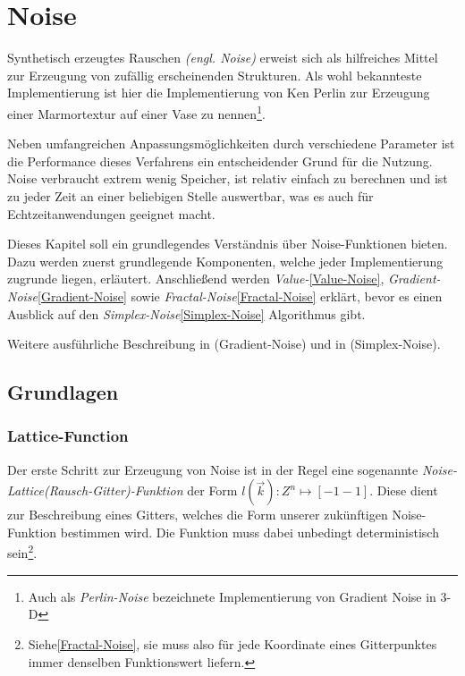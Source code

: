 \chapter{Noise}
Synthetisch erzeugtes Rauschen \emph{(engl. Noise)} erweist sich als hilfreiches Mittel zur Erzeugung von zufällig erscheinenden Strukturen.
Als wohl bekannteste Implementierung ist hier die Implementierung von Ken Perlin\cite{PERLIN1985} zur Erzeugung einer Marmortextur auf einer Vase zu nennen\footnote{Auch als \emph{Perlin-Noise} bezeichnete Implementierung von Gradient Noise in 3-D}.

Neben umfangreichen Anpassungsmöglichkeiten durch verschiedene Parameter ist die Performance dieses Verfahrens ein entscheidender Grund für die Nutzung. Noise verbraucht extrem wenig Speicher, ist relativ einfach zu berechnen und ist zu jeder Zeit an einer beliebigen Stelle auswertbar, was es auch für Echtzeitanwendungen geeignet macht.\cite{H.Hauser2010}

Dieses Kapitel soll ein grundlegendes Verständnis über Noise-Funktionen bieten. Dazu werden zuerst grundlegende Komponenten, welche jeder Implementierung zugrunde liegen, erläutert. Anschließend werden \emph{Value-}\ref{Value-Noise}, \emph{Gradient-Noise}\ref{Gradient-Noise} sowie \emph{Fractal-Noise}\ref{Fractal-Noise} erklärt, bevor es einen Ausblick auf den \emph{Simplex-Noise}\ref{Simplex-Noise} Algorithmus gibt.

Weitere ausführliche Beschreibung in \cite{BurgerGradientNoise2008} (Gradient-Noise) und in \cite{simplexNoise} (Simplex-Noise).

\section{Grundlagen}
\subsection{Lattice-Function}\label{latticeFunc}
Der erste Schritt zur Erzeugung von Noise ist in der Regel eine sogenannte \emph{Noise-Lattice(Rausch-Gitter)-Funktion}\cite{fractalsAndChaos} der Form \begin{math}l(\vec{k}): {Z}^n \mapsto [-1 - 1]\end{math}\label{latticeFunc}.
Diese dient zur Beschreibung eines Gitters, welches die Form unserer zukünftigen Noise-Funktion bestimmen wird. Die Funktion muss dabei unbedingt deterministisch sein\footnote{Siehe\ref{Fractal-Noise}, sie muss also für jede Koordinate eines Gitterpunktes immer denselben Funktionswert liefern.}.

